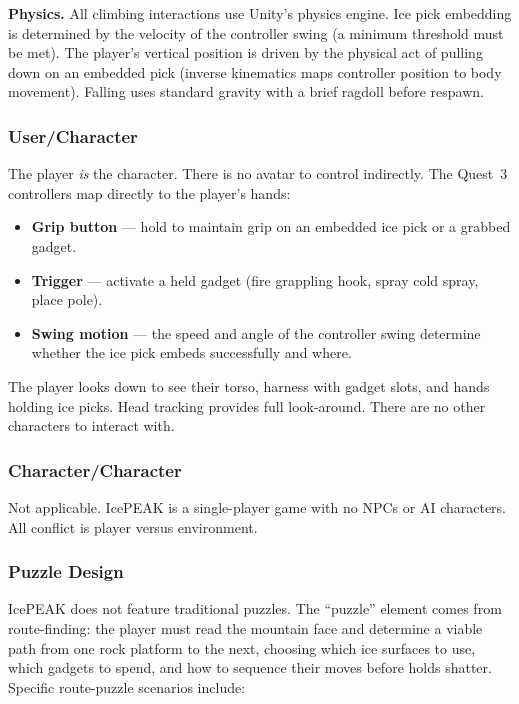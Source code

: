 \documentclass[12pt]{article}
\begin{document}
\textbf{Physics.} All climbing interactions use Unity's physics engine. Ice pick embedding is determined by the velocity of the controller swing (a minimum threshold must be met). The player's vertical position is driven by the physical act of pulling down on an embedded pick (inverse kinematics maps controller position to body movement). Falling uses standard gravity with a brief ragdoll before respawn.

\subsubsection{User/Character}

The player \emph{is} the character. There is no avatar to control indirectly. The Quest~3 controllers map directly to the player's hands:

\begin{itemize}[leftmargin=2em]
    \item \textbf{Grip button} --- hold to maintain grip on an embedded ice pick or a grabbed gadget.
    \item \textbf{Trigger} --- activate a held gadget (fire grappling hook, spray cold spray, place pole).
    \item \textbf{Swing motion} --- the speed and angle of the controller swing determine whether the ice pick embeds successfully and where.
\end{itemize}

The player looks down to see their torso, harness with gadget slots, and hands holding ice picks. Head tracking provides full look-around. There are no other characters to interact with.

\subsubsection{Character/Character}

Not applicable. IcePEAK is a single-player game with no NPCs or AI characters. All conflict is player versus environment.

\subsubsection{Puzzle Design}

IcePEAK does not feature traditional puzzles. The ``puzzle'' element comes from route-finding: the player must read the mountain face and determine a viable path from one rock platform to the next, choosing which ice surfaces to use, which gadgets to spend, and how to sequence their moves before holds shatter. Specific route-puzzle scenarios include:
\end{document}
